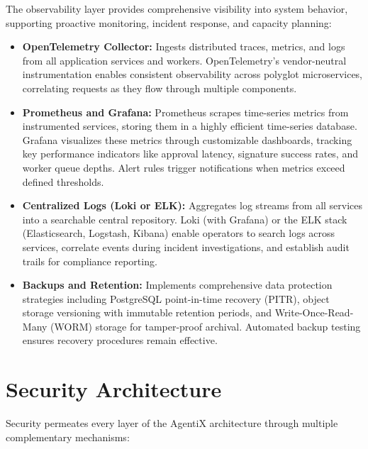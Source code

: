 \documentclass[12pt,oneside,openright,a4paper]{cpe-english-project}
\begin{document}
The observability layer provides comprehensive visibility into system behavior, supporting proactive monitoring, incident response, and capacity planning:

\begin{itemize}
\item \textbf{OpenTelemetry Collector:} Ingests distributed traces, metrics, and logs from all application services and workers. OpenTelemetry's vendor-neutral instrumentation enables consistent observability across polyglot microservices, correlating requests as they flow through multiple components.

\item \textbf{Prometheus and Grafana:} Prometheus scrapes time-series metrics from instrumented services, storing them in a highly efficient time-series database. Grafana visualizes these metrics through customizable dashboards, tracking key performance indicators like approval latency, signature success rates, and worker queue depths. Alert rules trigger notifications when metrics exceed defined thresholds.

\item \textbf{Centralized Logs (Loki or ELK):} Aggregates log streams from all services into a searchable central repository. Loki (with Grafana) or the ELK stack (Elasticsearch, Logstash, Kibana) enable operators to search logs across services, correlate events during incident investigations, and establish audit trails for compliance reporting.

\item \textbf{Backups and Retention:} Implements comprehensive data protection strategies including PostgreSQL point-in-time recovery (PITR), object storage versioning with immutable retention periods, and Write-Once-Read-Many (WORM) storage for tamper-proof archival. Automated backup testing ensures recovery procedures remain effective.
\end{itemize}

\vspace{1em}

\section{Security Architecture}

Security permeates every layer of the AgentiX architecture through multiple complementary mechanisms:
\end{document}
